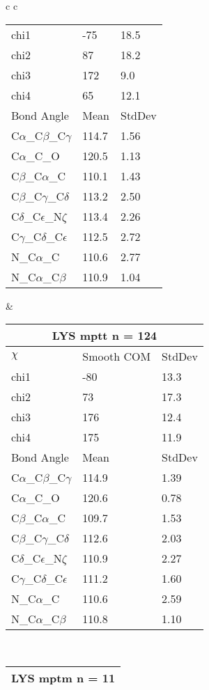 \begin{longtable}{ c c }
\begin{tabular}{ l l l }
  chi1 & -75 & 18.5 \\ 
  chi2 & 87 & 18.2 \\ 
  chi3 & 172 & 9.0 \\ 
  chi4 & 65 & 12.1 \\ \midrule
  Bond Angle   & Mean     & StdDev \\ \midrule
  C$\alpha$\_C$\beta$\_C$\gamma$ & 114.7 & 1.56\\
  C$\alpha$\_C\_O & 120.5 & 1.13\\
  C$\beta$\_C$\alpha$\_C & 110.1 & 1.43\\
  C$\beta$\_C$\gamma$\_C$\delta$ & 113.2 & 2.50\\
  C$\delta$\_C$\epsilon$\_N$\zeta$ & 113.4 & 2.26\\
  C$\gamma$\_C$\delta$\_C$\epsilon$ & 112.5 & 2.72\\
  N\_C$\alpha$\_C & 110.6 & 2.77\\
  N\_C$\alpha$\_C$\beta$ & 110.9 & 1.04\\
  \bottomrule
  \end{tabular}
  &
  \begin{tabular}{ l l l }
  \toprule
  \multicolumn{3}{c}{LYS \textbf{mptt} n = 124} \\ \toprule
  $\chi$       & Smooth COM & StdDev \\ \midrule
  chi1 & -80 & 13.3 \\ 
  chi2 & 73 & 17.3 \\ 
  chi3 & 176 & 12.4 \\ 
  chi4 & 175 & 11.9 \\ \midrule
  Bond Angle   & Mean     & StdDev \\ \midrule
  C$\alpha$\_C$\beta$\_C$\gamma$ & 114.9 & 1.39\\
  C$\alpha$\_C\_O & 120.6 & 0.78\\
  C$\beta$\_C$\alpha$\_C & 109.7 & 1.53\\
  C$\beta$\_C$\gamma$\_C$\delta$ & 112.6 & 2.03\\
  C$\delta$\_C$\epsilon$\_N$\zeta$ & 110.9 & 2.27\\
  C$\gamma$\_C$\delta$\_C$\epsilon$ & 111.2 & 1.60\\
  N\_C$\alpha$\_C & 110.6 & 2.59\\
  N\_C$\alpha$\_C$\beta$ & 110.8 & 1.10\\
  \bottomrule
  \end{tabular}
  \\
  \begin{tabular}{ l l l }
  \toprule
  \multicolumn{3}{c}{LYS \textbf{mptm} n = 11} \\ \toprule

\end{tabular}
\end{longtable}
